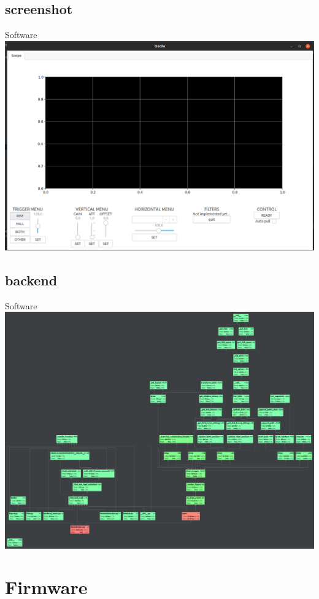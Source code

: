 \documentclass{beamer}
\begin{document}
	\subsection{screenshot}
		\begin{frame}{Software}
			\centering
			\includegraphics[width=0.95\linewidth]{oscilo_fake.png}
		\end{frame}
	\subsection{backend}	
		\begin{frame}{Software}
			\centering
			\includegraphics[width=\linewidth]{profile_fake.png}
		\end{frame}
	
\section{Firmware}
\end{document}
